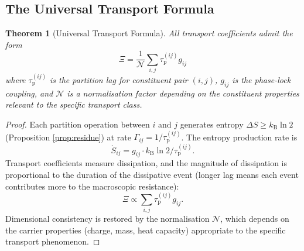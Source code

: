 \documentclass[twocolumn,10pt,a4paper]{article}
\newtheorem{theorem}{Theorem}[section]
\theoremstyle{definition}
\theoremstyle{remark}
\newcommand{\kB}{k_{\mathrm{B}}}
\newcommand{\tauP}{\tau_{\mathrm{p}}}
\newcommand{\Norm}{\mathcal{N}}
\newcommand{\Transp}{\Xi}
\begin{document}
\subsection{The Universal Transport Formula}

\begin{theorem}[Universal Transport Formula]
\label{thm:universal_transport}
All transport coefficients admit the form
\begin{equation}
\boxed{\Transp = \frac{1}{\Norm} \sum_{i,j} \tauP^{(ij)} g_{ij}}
\label{eq:universal_transport}
\end{equation}
where $\tauP^{(ij)}$ is the partition lag for constituent pair $(i,j)$, $g_{ij}$ is the phase-lock coupling, and $\Norm$ is a normalisation factor depending on the constituent properties relevant to the specific transport class.
\end{theorem}

\begin{proof}
Each partition operation between $i$ and $j$ generates entropy $\Delta S \geq \kB \ln 2$ (Proposition \ref{prop:residue}) at rate $\Gamma_{ij} = 1/\tauP^{(ij)}$. The entropy production rate is
\[
\dot S_{ij} = g_{ij} \cdot \kB \ln 2 / \tauP^{(ij)}.
\]
Transport coefficients measure dissipation, and the magnitude of dissipation is proportional to the duration of the dissipative event (longer lag means each event contributes more to the macroscopic resistance):
\[
\Transp \propto \sum_{i,j} \tauP^{(ij)} g_{ij}.
\]
Dimensional consistency is restored by the normalisation $\Norm$, which depends on the carrier properties (charge, mass, heat capacity) appropriate to the specific transport phenomenon.
\end{proof}
\end{document}
